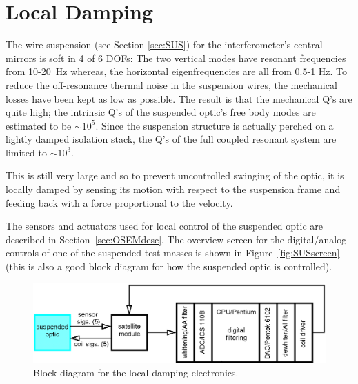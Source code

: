 \section{Local Damping}
\label{sec:OSEMs}

The wire suspension (see Section \ref{sec:SUS}) for the interferometer's central mirrors
is soft in 4 of 6 DOFs: The two vertical modes have
resonant frequencies from 10-20~Hz whereas, the horizontal eigenfrequencies are all from
0.5-1 Hz. To reduce the off-resonance thermal noise in the suspension wires,
the mechanical losses have been kept as low as possible. The result is that the
mechanical Q's are quite high; the intrinsic Q's of the suspended optic's free
body modes are estimated to be $\sim10^{5}$. Since the suspension structure
is actually perched on a lightly damped isolation stack, the Q's of the
full coupled resonant system are limited to $\sim10^{3}$.

This is still very large and so to prevent uncontrolled swinging of the optic,
it is locally damped by sensing its motion with respect to the suspension 
frame and feeding back with a force proportional to the velocity.

The sensors and actuators used for local control of the suspended optic
are described in Section~\ref{sec:OSEMdesc}.
The overview screen for the digital/analog
controls of one of the suspended test masses is shown in 
Figure~\ref{fig:SUSscreen} (this is also a good block diagram for how
the suspended optic is controlled).

\begin{figure}[!h]
\centerline{
\includegraphics[angle=0,width=6.5in]{Figures/Chap5/LocalDamping.png}}
\caption[OSEM wiring]{Block diagram for the local damping electronics.}
\label{fig:SUSwiring}
\end{figure}


